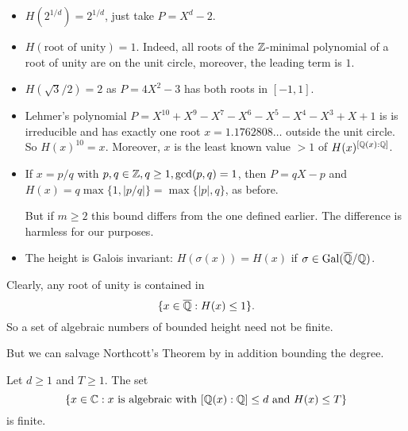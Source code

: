 \documentclass{beamer}
\begin{document}
\begin{frame}
  \begin{itemize}
  \item $H(2^{1/d}) = 2^{1/d}$, just take $P=X^d-2$.

  \item $H(\text{root of unity}) = 1$. Indeed, all roots of the
    ${\mathbb{Z}}$-minimal polynomial of a root of unity are on the unit
    circle, moreover, the leading term is $1$.

  \item $H(\sqrt{3}/2) = 2$ as $P = 4X^2-3$ has both roots in
    $[-1,1]$.

  \item Lehmer's polynomial $P=X^{10}+X^9-X^7-X^6-X^5-X^4-X^3+X+1$ is
    is irreducible and has exactly one root $x=1.1762808\ldots$ outside the
    unit circle. So $H(x)^{10} = x$. Moreover, $x$ is the least known
    value $>1$ of $H(x)^{[{\mathbb{Q}}(x):{\mathbb{Q}}]}$. 
    
  \item If $x=p/q$ with $p,q\in{\mathbb{Z}},q\ge 1,\gcd(p,q)=1$, then
    $P=qX-p$ and $H(x) = q\max\{1,|p/q|\} = \max\{|p|,q\}$, as before. 

    But if $m\ge 2$ this bound \alert{differs}  from the one defined
    earlier. The difference is harmless for our purposes.
    
  \item The height is Galois invariant:
    $H(\sigma(x))=H(x)$ if $\sigma\in\mathrm{Gal}({\overline{\mathbb{Q}}}/{\mathbb{Q}})$. 
  \end{itemize}
\end{frame}

\begin{frame}
  Clearly, any root of unity is contained in
  \begin{equation*}
    \{x\in{\overline{\mathbb{Q}}} : H(x)\le 1\}.
  \end{equation*}
  So a set of algebraic numbers of bounded height need \alert{not} be finite.
  
  But we can salvage Northcott's Theorem by in addition
  bounding the degree.
  
  \begin{theorem}
    Let $d\ge 1$ and $T\ge 1$. The set
    \begin{equation*}
      \{x\in {\mathbb{C}} : x \text{ is algebraic with }[{\mathbb{Q}}(x):{\mathbb{Q}}]\le d\text{
        and }H(x)\le T\}
    \end{equation*}
    is finite. 
  \end{theorem}
\end{frame}
\end{document}
